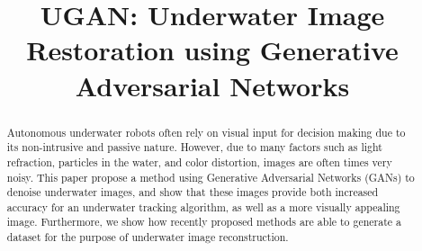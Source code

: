 \documentclass[conference,reqno]{IEEEtran}
\begin{document}
\title{UGAN: Underwater Image Restoration using Generative Adversarial Networks}

\author{
\and
{}
\and
{}
}

% 

\maketitle

\begin{abstract}
Autonomous underwater robots often rely on visual input for decision making due to its non-intrusive and passive nature.
However, due to many factors such as light refraction, particles in the water, and color distortion, images are often times very noisy.
This paper propose a method using Generative Adversarial Networks (GANs) to denoise underwater images, and show that these 
images provide both increased accuracy for an underwater tracking algorithm, as well as a more visually appealing image.
Furthermore, we show how recently proposed methods are able to generate a dataset for the purpose of underwater image reconstruction.
\end{abstract}
\end{document}
